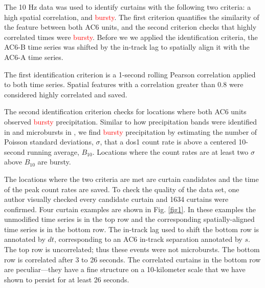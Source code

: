 \documentclass[draft]{agujournal2019}
\begin{document}
The 10 Hz data was used to identify curtains with the following two criteria: a high spatial correlation, and \textcolor{red}{bursty}. The first criterion quantifies the similarity of the feature between both AC6 units, and the second criterion checks that highly correlated times were \textcolor{red}{bursty}. Before we we applied the identification criteria, the AC6-B time series was shifted by the in-track lag to spatially align it with the AC6-A time series. 

The first identification criterion is a 1-second rolling Pearson correlation applied to both time series. Spatial features with a correlation greater than 0.8 were considered highly correlated and saved.

The second identification criterion checks for locations where both AC6 units observed \textcolor{red}{bursty} precipitation. Similar to how precipitation bands were identified in  and microbursts in , we find \textcolor{red}{bursty} precipitation by estimating the number of Poisson standard deviations, $\sigma$, that a dos1 count rate is above a centered 10-second running average, $B_{10}$. Locations where the count rates are at least two $\sigma$ above $B_{10}$ are bursty. 

The locations where the two criteria are met are curtain candidates and the time of the peak count rates are saved. To check the quality of the data set, one author visually checked every candidate curtain and 1634 curtains were confirmed. Four curtain examples are shown in Fig. \ref{fig1}. In these examples the unmodified time series is in the top row and the corresponding spatially-aligned time series is in the bottom row. The in-track lag used to shift the bottom row is annotated by $dt$, corresponding to an AC6 in-track separation annotated by $s$. The top row is uncorrelated; thus these events were not microbursts. The bottom row is correlated after 3 to 26 seconds. The correlated curtains in the bottom row are peculiar---they have a fine structure on a 10-kilometer scale that we have shown to persist for at least 26 seconds.

\end{document}
